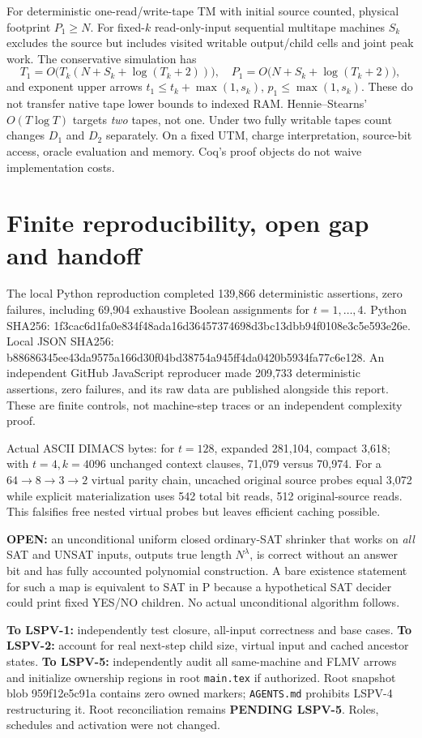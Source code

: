 \documentclass[11pt]{article}
\begin{document}
For deterministic one-read/write-tape TM with initial source counted, physical footprint $P_1\ge N$. For fixed-$k$ read-only-input sequential multitape machines $S_k$ excludes the source but includes visited writable output/child cells and joint peak work. The conservative simulation has
\[
 T_1=O\bigl(T_k(N+S_k+\log(T_k+2))\bigr),\quad
 P_1=O\bigl(N+S_k+\log(T_k+2)\bigr),
\]
and exponent upper arrows $t_1\le t_k+\max(1,s_k)$, $p_1\le\max(1,s_k)$. These do not transfer native tape lower bounds to indexed RAM. Hennie--Stearns' $O(T\log T)$ targets \emph{two} tapes, not one. Under two fully writable tapes count changes $D_1$ and $D_2$ separately. On a fixed UTM, charge interpretation, source-bit access, oracle evaluation and memory. Coq's proof objects do not waive implementation costs.

\section{Finite reproducibility, open gap and handoff}
The local Python reproduction completed 139,866 deterministic assertions, zero failures, including 69,904 exhaustive Boolean assignments for $t=1,\ldots,4$. Python SHA256: 1f3cac6d1fa0e834f48ada16d36457374698d3bc13dbb94f0108e3c5e593e26e. Local JSON SHA256: b88686345ee43da9575a166d30f04bd38754a945ff4da0420b5934fa77c6e128. An independent GitHub JavaScript reproducer made 209,733 deterministic assertions, zero failures, and its raw data are published alongside this report. These are finite controls, not machine-step traces or an independent complexity proof.

Actual ASCII DIMACS bytes: for $t=128$, expanded 281,104, compact 3,618; with $t=4,k=4096$ unchanged context clauses, 71,079 versus 70,974. For a $64\to8\to3\to2$ virtual parity chain, uncached original source probes equal 3,072 while explicit materialization uses 542 total bit reads, 512 original-source reads. This falsifies free nested virtual probes but leaves efficient caching possible.

\textbf{OPEN:} an unconditional uniform closed ordinary-SAT shrinker that works on \emph{all} SAT and UNSAT inputs, outputs true length $N^\lambda$, is correct without an answer bit and has fully accounted polynomial construction. A bare existence statement for such a map is equivalent to SAT in P because a hypothetical SAT decider could print fixed YES/NO children. No actual unconditional algorithm follows.

\textbf{To LSPV-1:} independently test closure, all-input correctness and base cases.
\textbf{To LSPV-2:} account for real next-step child size, virtual input and cached ancestor states.
\textbf{To LSPV-5:} independently audit all same-machine and FLMV arrows and initialize ownership regions in root \texttt{main.tex} if authorized. Root snapshot blob 959f12e5c91a contains zero owned markers; \texttt{AGENTS.md} prohibits LSPV-4 restructuring it. Root reconciliation remains \textbf{PENDING LSPV-5}. Roles, schedules and activation were not changed.
\end{document}
